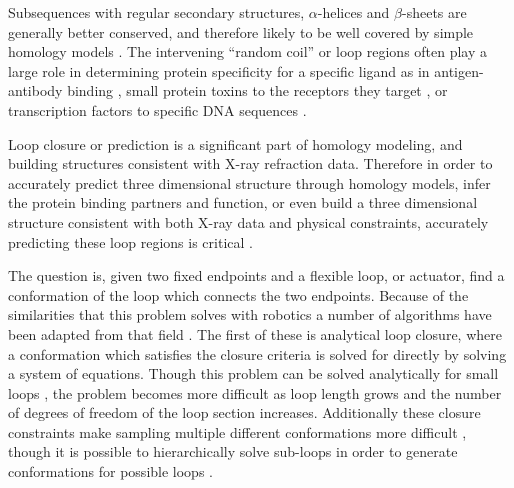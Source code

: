 Subsequences with regular secondary structures, $\alpha$-helices and $\beta$-sheets are generally better conserved, and therefore likely to be well covered by simple homology models \cite{kolodny2005inverse}.
The intervening ``random coil'' or loop regions often play a large role in determining protein specificity for a specific ligand as in antigen-antibody binding \cite{bajorath1996comparison}, small protein toxins to the receptors they target \cite{wu1996functional}, or transcription factors to specific DNA sequences \cite{jones1999protein}.

Loop closure or prediction is a significant part of homology modeling, and building structures consistent with X-ray refraction data.
Therefore in order to accurately predict three dimensional structure through homology models, infer the protein binding partners and function, or even build a three dimensional structure consistent with both X-ray data and physical constraints, accurately predicting these loop regions is critical \cite{fiser2000modeling}.

The question is, given two fixed endpoints and a flexible loop, or actuator, find a conformation of the loop which connects the two endpoints.
Because of the similarities that this problem solves with robotics a number of algorithms have been adapted from that field \cite{kolodny2005inverse}.
The first of these is analytical loop closure, where a conformation which satisfies the closure criteria is solved for directly by solving a system of equations.
Though this problem can be solved analytically for small loops \cite{wedemeyer1999exact,go1970ring,bruccoleri1985chain,palmer1991standard}, the problem becomes more difficult as loop length grows and the number of degrees of freedom of the loop section increases.
Additionally these closure constraints make sampling multiple different conformations more difficult \cite{cortes2005sampling}, though it is possible to hierarchically solve sub-loops in order to generate conformations for possible loops \cite{wedemeyer1999exact}.

